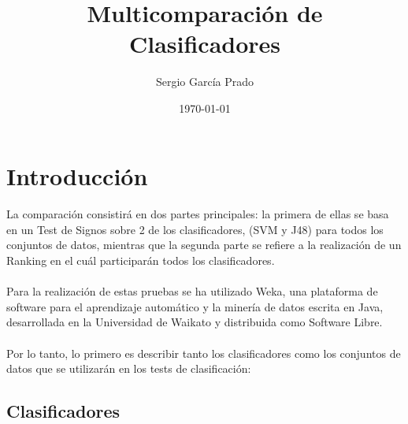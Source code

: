 \documentclass[10pt, a4paper,spanish]{article}
\title{\vspace{-15mm}\fontsize{24pt}{10pt}\selectfont\textbf{Multicomparación de \\ Clasificadores}} %
\author{Sergio García Prado}
\date{\today}
\begin{document}
	\maketitle %

	\thispagestyle{fancy} %


	\section{Introducción}

        \paragraph{}
		La comparación consistirá en dos partes principales: la primera de ellas se basa en un Test de Signos sobre 2 de los clasificadores, (SVM y J48) para todos los conjuntos de datos, mientras que la segunda parte se refiere a la realización de un Ranking en el cuál participarán todos los clasificadores.

		\paragraph{}
		Para la realización de estas pruebas se ha utilizado Weka, una plataforma de software para el aprendizaje automático y la minería de datos escrita en Java, desarrollada en la Universidad de Waikato y distribuida como Software Libre.

		\paragraph{}
		Por lo tanto, lo primero es describir tanto los clasificadores como los conjuntos de datos que se utilizarán en los tests de clasificación:

		\subsection{Clasificadores}
\end{document}
